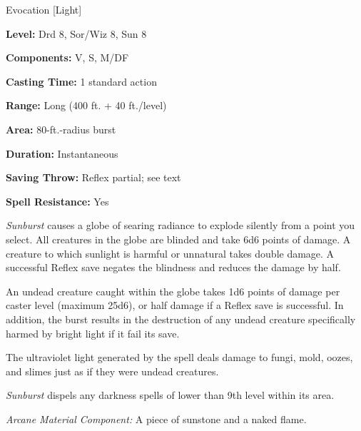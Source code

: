 
Evocation [Light]

\textbf{Level:} Drd 8, Sor/Wiz 8, Sun 8

\textbf{Components:} V, S, M/DF

\textbf{Casting Time:} 1 standard action

\textbf{Range:} Long (400 ft. + 40 ft./level)

\textbf{Area:} 80-ft.-radius burst

\textbf{Duration:} Instantaneous

\textbf{Saving Throw:} Reflex partial; see text

\textbf{Spell Resistance:} Yes

\textit{Sunburst} causes a globe of searing radiance to explode silently from a 
point you select. All creatures in the globe are blinded and take 6d6 points of 
damage. A creature to which sunlight is harmful or unnatural takes double damage. 
A successful Reflex save negates the blindness and reduces the damage by half.

An undead creature caught within the globe takes 1d6 points of damage per caster 
level (maximum 25d6), or half damage if a Reflex save is successful. In addition, 
the burst results in the destruction of any undead creature specifically harmed 
by bright light if it fail its save.

The ultraviolet light generated by the spell deals damage to fungi, mold, oozes, 
and slimes just as if they were undead creatures.

\textit{Sunburst} dispels any darkness spells of lower than 9th level within its 
area.

\textit{Arcane Material Component:} A piece of sunstone and a naked flame.

